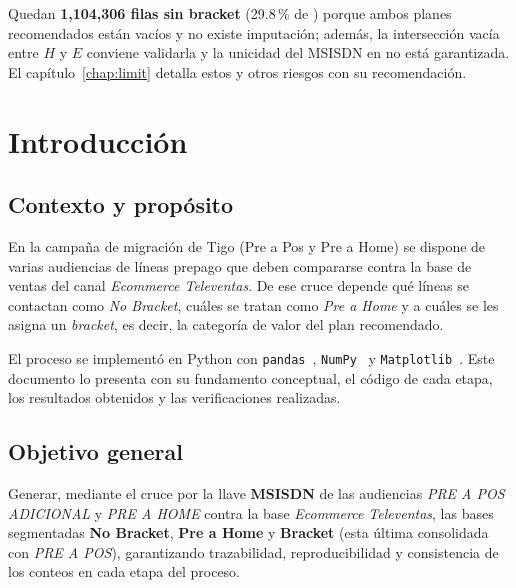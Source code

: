 \documentclass[11pt,a4paper,oneside]{book}
\DeclareRobustCommand{\cod}[1]{\texttt{\detokenize{#1}}}
\newcommand{\pct}[1]{#1\,\%}
\begin{document}
\begin{alerta}
Quedan \textbf{1,104,306 filas sin bracket} (\pct{29.8} de \cod{df_final}) porque ambos planes recomendados están vacíos y no existe imputación; además, la intersección vacía entre $H$ y $E$ conviene validarla y la unicidad del MSISDN en \cod{df_final} no está garantizada. El capítulo~\ref{chap:limit} detalla estos y otros riesgos con su recomendación.
\end{alerta}

\clearpage
\pagestyle{main}
\tableofcontents
\clearpage
\listoffigures
\clearpage
\listoftables
\clearpage
\listoflistings

\mainmatter

\chapter{Introducción}\label{chap:intro}

\section{Contexto y propósito}
En la campaña de migración de Tigo (Pre a Pos y Pre a Home) se dispone de varias audiencias de líneas prepago que deben compararse contra la base de ventas del canal \emph{Ecommerce Televentas}. De ese cruce depende qué líneas se contactan como \emph{No Bracket}, cuáles se tratan como \emph{Pre a Home} y a cuáles se les asigna un \emph{bracket}, es decir, la categoría de valor del plan recomendado.

El proceso se implementó en Python con \texttt{pandas}~\cite{mckinney2010}, \texttt{NumPy}~\cite{harris2020} y \texttt{Matplotlib}~\cite{hunter2007}. Este documento lo presenta con su fundamento conceptual, el código de cada etapa, los resultados obtenidos y las verificaciones realizadas.

\section{Objetivo general}
Generar, mediante el cruce por la llave \textbf{MSISDN} de las audiencias \emph{PRE A POS ADICIONAL} y \emph{PRE A HOME} contra la base \emph{Ecommerce Televentas}, las bases segmentadas \textbf{No Bracket}, \textbf{Pre a Home} y \textbf{Bracket} (esta última consolidada con \emph{PRE A POS}), garantizando trazabilidad, reproducibilidad y consistencia de los conteos en cada etapa del proceso.
\end{document}
